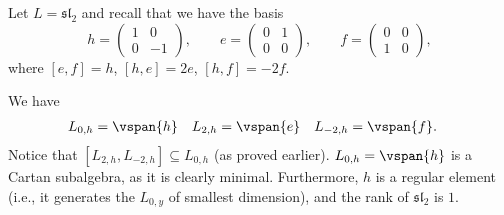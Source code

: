 Let $L = \mathfrak{sl}_2$ and recall that we have the basis
\[ h = \begin{pmatrix}1&0\\0&-1\end{pmatrix},\qquad e=\begin{pmatrix}0&1\\0&0\end{pmatrix},\qquad f=\begin{pmatrix}0&0\\1&0\end{pmatrix}, \]
where $[e, f] = h$, $[h, e] = 2e$, $[h, f] = -2f$.

We have
\begin{align*}
	L_{0, h} &= \vspan{h} & L_{2, h} &= \vspan{e} & L_{-2, h} &= \vspan{f}.
\end{align*}
Notice that $[L_{2, h}, L_{-2, h}] \subseteq L_{0, h}$ (as proved earlier).
$L_{0, h} = \vspan{h}$ is a Cartan subalgebra, as it is clearly minimal.
Furthermore, $h$ is a regular element (i.e., it generates the $L_{0, y}$ of
smallest dimension), and the rank of $\mathfrak{sl}_2$ is $1$.
